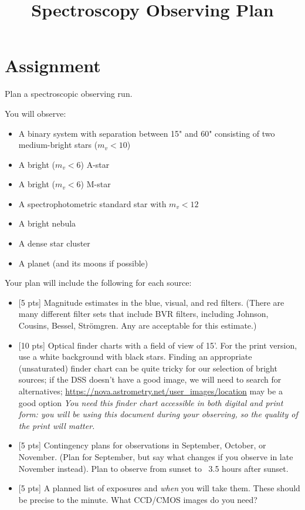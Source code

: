 \documentclass[11pt]{article}
\begin{document}
\title{Spectroscopy Observing Plan}
\maketitle


\section{Assignment}
Plan a spectroscopic observing run.  

 

You will observe:

\begin{itemize}
 \item A binary system with separation between 15" and 60" consisting of two medium-bright stars ($m_v < 10$)
 \item A bright ($m_v < 6$) A-star
 \item A bright ($m_v < 6$) M-star
 \item A spectrophotometric standard star with $m_v < 12$
 \item A bright nebula
 \item A dense star cluster
 \item A planet (and its moons if possible)
\end{itemize}
 

Your plan will include the following for each source:

\begin{itemize}
    \item {[5 pts]} Magnitude estimates in the blue, visual, and red
        filters.  (There are many different filter sets that include BVR
        filters, including Johnson, Cousins, Bessel, Strömgren.  Any are
        acceptable for this estimate.)
    \item {[10 pts]} Optical finder charts with a field of view of 15'.
        For the print version, use a white background with black stars.
         Finding an appropriate (unsaturated) finder chart can be quite tricky
         for our selection of bright sources; if the DSS doesn't have a good
         image, we will need to search for alternatives;
        \url{https://nova.astrometry.net/user_images/location}  may be a good option
        \emph{You need this finder chart accessible in both digital and print form:
        you will be using this document during your observing, so the quality of the 
        print will matter.}
    \item {[5 pts]} Contingency plans for observations in September, October, or
        November.  (Plan for September, but say what changes if you observe in
        late November instead).  Plan to observe from sunset to ~3.5 hours
        after sunset.
    \item {[5 pts]} A planned list of exposures and \emph{when} you will take them.
        These should be precise to the minute.  What CCD/CMOS images do you
        need?
\end{itemize}
 
\end{document}
